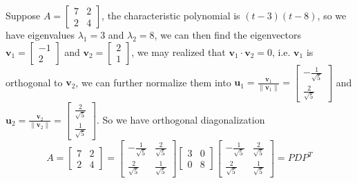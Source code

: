 \documentclass{beamer}
\theoremstyle{definition}
\theoremstyle{remark}
\begin{document}
\begin{frame}[t]
\begin{example}\label{12:47-07/20/2022}
Suppose $A=\begin{bmatrix}
7&2\\
2&4
\end{bmatrix}$\pause, the characteristic polynomial is $(t-3)(t-8)$, so we have eigenvalues $\lambda_1=3$ and $\lambda_2=8$\pause, we can then find the eigenvectors $\mathbf v_1=\begin{bmatrix}
-1\\2
\end{bmatrix}$ and $\mathbf v_2=\begin{bmatrix}
2\\1
\end{bmatrix}$\pause, we may realized that $\mathbf v_1\cdot\mathbf v_2=0$, i.e. $\mathbf v_1$ is orthogonal to $\mathbf v_2$, we can further normalize them into $\mathbf u_1=\frac{\mathbf v_1}{\|\mathbf v_1\|}=\begin{bmatrix}
-\frac{1}{\sqrt5}\\\frac{2}{\sqrt5}
\end{bmatrix}$ and $\mathbf u_2=\frac{\mathbf v_2}{\|\mathbf v_2\|}=\begin{bmatrix}
\frac{2}{\sqrt5}\\\frac{1}{\sqrt5}
\end{bmatrix}$\pause. So we have orthogonal diagonalization
\[
A=\begin{bmatrix}
7&2\\
2&4
\end{bmatrix}=\begin{bmatrix}
-\frac{1}{\sqrt5}&\frac{2}{\sqrt5}\\
\frac{2}{\sqrt5}&\frac{1}{\sqrt5}
\end{bmatrix}\begin{bmatrix}
3&0\\
0&8
\end{bmatrix}\begin{bmatrix}
-\frac{1}{\sqrt5}&\frac{2}{\sqrt5}\\
\frac{2}{\sqrt5}&\frac{1}{\sqrt5}
\end{bmatrix}=PDP^T
\]
\end{example}
\end{frame}
\end{document}
